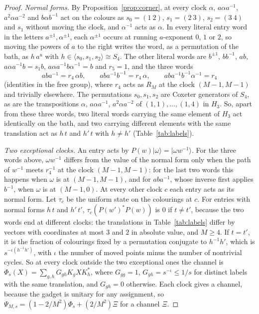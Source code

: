 \documentclass[11pt,a4paper]{article}
\theoremstyle{plain}
\theoremstyle{definition}
\theoremstyle{remark}
\begin{document}
\begin{proof}
\emph{Normal forms.} By Proposition~\ref{prop:corner}, at every clock $\alpha$, $a\alpha a^{-1}$, $a^2\alpha a^{-2}$ and
$b\alpha b^{-1}$ act on the colours as $s_0=(1\ 2)$, $s_1=(2\ 3)$, $s_2=(3\ 4)$ and $s_1$ without moving the clock, and $\alpha^{-1}$
acts as $\alpha$. In every literal entry word in the letters $a^{\pm1},\alpha^{\pm1}$, each $\alpha^{\pm1}$ occurs at running $a$-exponent
$0$, $1$ or $2$, so moving the powers of $a$ to the right writes the word, as a permutation of the bath, as $h\,a^u$ with
$h\in\langle s_0,s_1,s_2\rangle\cong S_4$. The other literal words are $b^{\pm1}$, $bb^{-1}$, $ab$, $a\alpha a^{-1}b=s_1b$,
$a\alpha a^{-1}b\alpha^{-1}=b$ and $r_5=1$, and the three words
\[
aba^{-1}=r_4\,\alpha b,\qquad aba^{-1}b^{-1}=r_4\,\alpha,\qquad aba^{-1}b^{-1}\alpha^{-1}=r_4
\]
(identities in the free group), where $r_4$ acts as $R_M$ at the clock $(M-1,M-1)$ and trivially elsewhere. The permutations $s_0,s_1,s_2$
are Coxeter generators of $S_4$, as are the transpositions $\alpha$, $a\alpha a^{-1}$, $a^2\alpha a^{-2}$ of $(1,1),\dots,(1,4)$ in $H_3$.
So, apart from these three words, two literal words carrying the same element of $H_3$ act identically on the bath, and two carrying
different elements with the same translation act as $h\,t$ and $h'\,t$ with $h\ne h'$ (Table~\ref{tab:labels}).

\emph{Two exceptional clocks.} An entry acts by $P(w)|\omega\rangle=|\omega w^{-1}\rangle$. For the three words above, $\omega w^{-1}$
differs from the value of the normal form only when the path of $w^{-1}$ meets $r_4^{-1}$ at the clock $(M-1,M-1)$: for the last two
words this happens when $\omega$ is at $(M-1,M-1)$, and for $aba^{-1}$, whose inverse first applies $b^{-1}$, when $\omega$ is at
$(M-1,0)$. At every other clock $c$ each entry acts as its normal form. Let $\tau_c$ be the uniform state on the colourings at $c$.
For entries with normal forms $h\,t$ and $h'\,t'$, $\tau_c(P(w')^*P(w))$ is $0$ if $t\ne t'$, because the two words end at different
clocks: the translations in Table~\ref{tab:labels} differ by vectors with coordinates at most $3$ and $2$ in absolute value, and
$M\ge4$. If $t=t'$, it is the fraction of colourings fixed by a permutation conjugate to $h^{-1}h'$, which is $s^{-\iota(h^{-1}h')}$, with
$\iota$ the number of moved points minus the number of nontrivial cycles. So at every clock outside the two exceptional ones the channel
is $\Phi_s(X)=\sum_{g,h}G_{gh}K_gXK_h^*$, where $G_{gg}=1$, $G_{gh}=s^{-\iota}\le1/s$ for distinct labels with the same translation, and
$G_{gh}=0$ otherwise. Each clock gives a channel, because the gadget is unitary for any assignment, so
$\Psi_{M,s}=(1-2/M^2)\Phi_s+(2/M^2)\Xi$ for a channel $\Xi$.


\end{proof}
\end{document}
